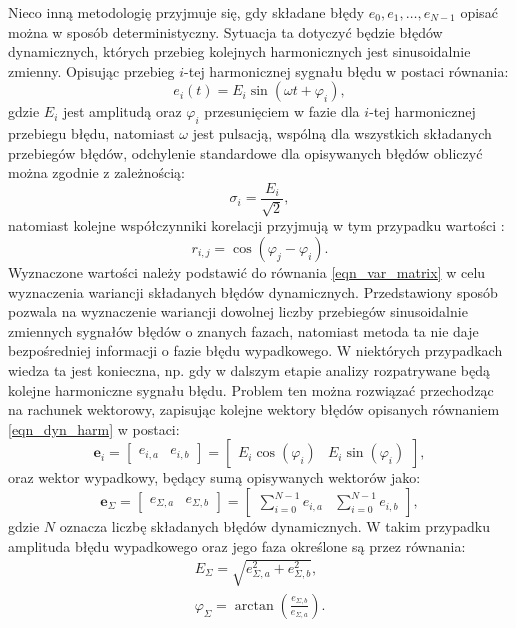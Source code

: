 Nieco inną metodologię przyjmuje się, gdy składane błędy $e_{0}, e_{1}, \hdots, e_{N-1}$ opisać można w sposób deterministyczny. Sytuacja ta dotyczyć będzie błędów dynamicznych, których przebieg kolejnych harmonicznych jest sinusoidalnie zmienny. Opisując przebieg $i$-tej harmonicznej sygnału błędu w postaci równania:
\begin{equation}
e_{i}(t) = E_{i} \sin(\omega t + \varphi_{i}) \label{eqn_dyn_harm},
\end{equation}
gdzie $E_{i}$ jest amplitudą oraz $\varphi_{i}$ przesunięciem w fazie dla $i$-tej harmonicznej przebiegu błędu, natomiast $\omega$ jest pulsacją, wspólną dla wszystkich składanych przebiegów błędów, odchylenie standardowe dla opisywanych błędów obliczyć można zgodnie z zależnością:
\begin{equation}
\sigma_{i} = \frac{E_{i}}{\sqrt{2}} \label{eqn_dyn_std},
\end{equation}
natomiast kolejne współczynniki korelacji przyjmują w tym przypadku wartości \cite{jakubiec_system}:
\begin{equation}
r_{i,j} = \cos(\varphi_{j} - \varphi_{i}) \label{eqn_dyn_corr}.
\end{equation}
Wyznaczone wartości należy podstawić do równania \eqref{eqn_var_matrix} w celu wyznaczenia wariancji składanych błędów dynamicznych. Przedstawiony sposób pozwala na wyznaczenie wariancji dowolnej liczby przebiegów sinusoidalnie zmiennych sygnałów błędów o znanych fazach, natomiast metoda ta nie daje bezpośredniej informacji o fazie błędu wypadkowego. W niektórych przypadkach wiedza ta jest konieczna, np. gdy w dalszym etapie analizy rozpatrywane będą kolejne harmoniczne sygnału błędu. Problem ten można rozwiązać przechodząc na rachunek wektorowy, zapisując kolejne wektory błędów opisanych równaniem \eqref{eqn_dyn_harm} w postaci:
\begin{equation}
\mathbf{e}_{i} = 
\begin{bmatrix} 
e_{i,a} & e_{i,b} 
\end{bmatrix} 
=
\begin{bmatrix} 
E_{i} \cos(\varphi_{i}) & E_{i} \sin(\varphi_{i})
\end{bmatrix} 
\label{eqn_dyn_vect},
\end{equation}
oraz wektor wypadkowy, będący sumą opisywanych wektorów jako:
\begin{equation}
\mathbf{e}_{\Sigma} = 
\begin{bmatrix} 
e_{\Sigma,a} & e_{\Sigma,b} 
\end{bmatrix}
=
\begin{bmatrix} 
\sum _{i = 0} ^{N-1} e_{i,a} & \sum _{i = 0} ^{N-1} e_{i,b}
\end{bmatrix}
\label{eqn_dyn_vect_sum},
\end{equation}
gdzie $N$ oznacza liczbę składanych błędów dynamicznych. W takim przypadku amplituda błędu wypadkowego oraz jego faza określone są przez równania:
\begin{gather}
E_{\Sigma} = \sqrt{e_{\Sigma,a}^2 + e_{\Sigma,b}^2} \label{eqn_dyn_vect_amp}, \\
\varphi_{\Sigma} = \arctan \left( \frac{e_{\Sigma,b}}{e_{\Sigma,a}} \right) \label{eqn_dyn_vect_phi}.
\end{gather}

